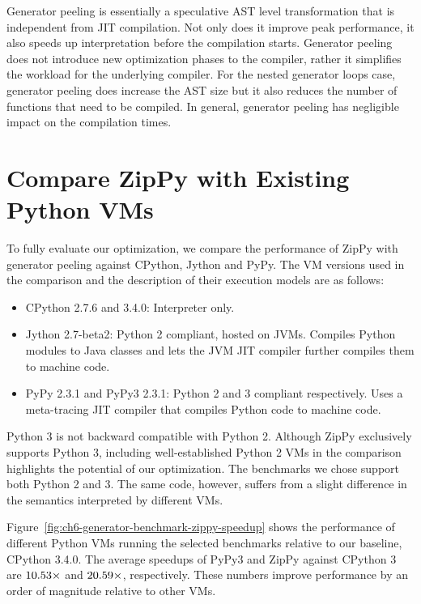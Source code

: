 Generator peeling is essentially a speculative AST level transformation that is independent from JIT compilation.
Not only does it improve peak performance, it also speeds up interpretation before the compilation starts.
Generator peeling does not introduce new optimization phases to the compiler, rather it simplifies the workload for the underlying compiler.
For the nested generator loops case, generator peeling does increase the AST size but it also reduces the number of functions that need to be compiled.
In general, generator peeling has negligible impact on the compilation times.


\section{Compare ZipPy with Existing Python VMs}

To fully evaluate our optimization, we compare the performance of ZipPy with generator peeling against CPython, Jython and PyPy.
The VM versions used in the comparison and the description of their execution models are as follows:

\begin{itemize}

\item CPython 2.7.6 and 3.4.0: Interpreter only.

\item Jython 2.7-beta2:
Python 2 compliant, hosted on JVMs.
Compiles Python modules to Java classes and lets the JVM JIT compiler further compiles them to machine code.

\item PyPy 2.3.1 and PyPy3 2.3.1: Python 2 and 3 compliant respectively.
Uses a meta-tracing JIT compiler that compiles Python code to machine code.

\end{itemize}

Python 3 is not backward compatible with Python 2.
Although ZipPy exclusively supports Python 3, including well-established Python 2 VMs in the comparison highlights the potential of our optimization.
The benchmarks we chose support both Python 2 and 3.
The same code, however, suffers from a slight difference in the semantics interpreted by different VMs.

Figure~\ref{fig:ch6-generator-benchmark-zippy-speedup} shows the performance of different Python VMs running the selected benchmarks relative to our baseline, CPython 3.4.0.
The average speedups of PyPy3 and ZipPy against CPython 3 are $10.53{}\times$ and $20.59{}\times$, respectively.
These numbers improve performance by an order of magnitude relative to other VMs.

